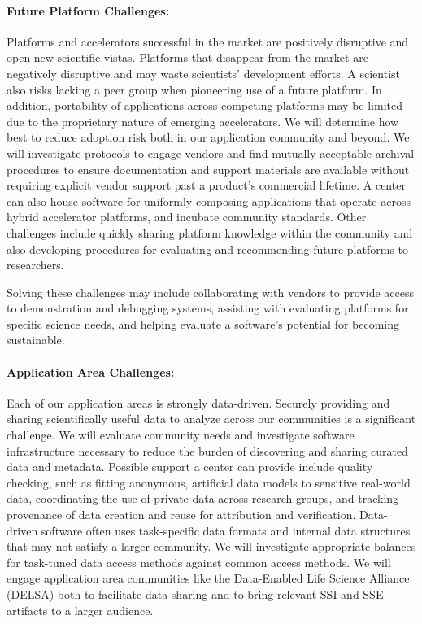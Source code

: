 \paragraph{Future Platform Challenges:} Platforms and accelerators successful in the market are positively
disruptive and open new scientific vistas. Platforms that disappear from the market are negatively
disruptive and may waste scientists' development efforts. A scientist also risks lacking a peer group
when pioneering use of a future platform. In addition, portability of applications across competing
platforms may be limited due to the proprietary nature of emerging accelerators.
We will determine how best to reduce adoption risk both in our application community and
beyond. We will investigate protocols to engage vendors and find mutually acceptable archival
procedures to ensure documentation and support materials are available without requiring explicit
vendor support past a product's commercial lifetime. A center can also house software for uniformly
composing applications that operate across hybrid accelerator platforms, and incubate community
standards. Other challenges include quickly sharing platform knowledge within the community
and also developing procedures for evaluating and recommending future platforms to researchers.

Solving these challenges may include collaborating with vendors to provide access to demonstration
and debugging systems, assisting with evaluating platforms for specific science needs, and helping
evaluate a software’s potential for becoming sustainable.

\paragraph{Application Area Challenges:} Each of our application areas is strongly data-driven. Securely
providing and sharing scientifically useful data to analyze across our communities is a significant
challenge. We will evaluate community needs and investigate software infrastructure necessary
to reduce the burden of discovering and sharing curated data and metadata. Possible support a
center can provide include quality checking, such as fitting anonymous, 
artificial data models to sensitive real-world data, 
coordinating the use of private data across research groups, and tracking
provenance of data creation and reuse for attribution and verification.
Data-driven software often uses task-specific data formats and internal data structures that may
not satisfy a larger community. We will investigate appropriate balances for task-tuned data access
methods against common access methods. We will engage application area communities like the
Data-Enabled Life Science Alliance (DELSA) both to facilitate data sharing and to bring relevant
SSI and SSE artifacts to a larger audience.

